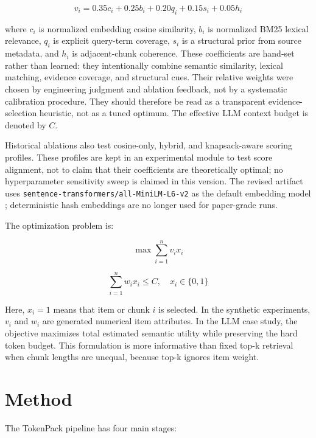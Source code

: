 \documentclass[conference]{IEEEtran}
\begin{document}
\begin{equation}
v_i = 0.35c_i + 0.25b_i + 0.20q_i + 0.15s_i + 0.05h_i
\end{equation}

where $c_i$ is normalized embedding cosine similarity, $b_i$ is normalized BM25 lexical relevance, $q_i$ is explicit query-term coverage, $s_i$ is a structural prior from source metadata, and $h_i$ is adjacent-chunk coherence. These coefficients are hand-set rather than learned: they intentionally combine semantic similarity, lexical matching, evidence coverage, and structural cues. Their relative weights were chosen by engineering judgment and ablation feedback, not by a systematic calibration procedure. They should therefore be read as a transparent evidence-selection heuristic, not as a tuned optimum. The effective LLM context budget is denoted by $C$.

Historical ablations also test cosine-only, hybrid, and knapsack-aware scoring profiles. These profiles are kept in an experimental module to test score alignment, not to claim that their coefficients are theoretically optimal; no hyperparameter sensitivity sweep is claimed in this version. The revised artifact uses \texttt{sentence-transformers/all-MiniLM-L6-v2} as the default embedding model \cite{reimers2019sentencebert,sentenceTransformersMiniLM}; deterministic hash embeddings are no longer used for paper-grade runs.

The optimization problem is:

\begin{equation}
\max \sum_{i=1}^{n} v_i x_i
\end{equation}

\begin{equation}
\sum_{i=1}^{n} w_i x_i \leq C,\quad x_i \in \{0,1\}
\end{equation}

Here, $x_i=1$ means that item or chunk $i$ is selected. In the synthetic experiments, $v_i$ and $w_i$ are generated numerical item attributes. In the LLM case study, the objective maximizes total estimated semantic utility while preserving the hard token budget. This formulation is more informative than fixed top-k retrieval when chunk lengths are unequal, because top-k ignores item weight.

\section{Method}
The TokenPack pipeline has four main stages:
\end{document}
